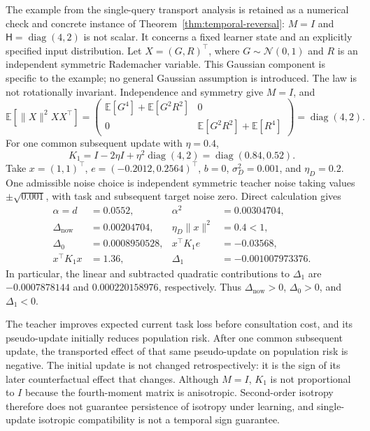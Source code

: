 The example from the single-query transport analysis is retained as a
numerical check and concrete instance of Theorem~\ref{thm:temporal-reversal}:
$M=I$ and $\mathsf H=\operatorname{diag}(4,2)$ is not scalar. It concerns
a fixed learner state and an explicitly specified input distribution.
Let $X=(G,R)^\top$, where $G\sim\mathcal N(0,1)$
and $R$ is an independent symmetric Rademacher variable. This Gaussian
component is specific to the example; no general Gaussian assumption is
introduced. The law is not rotationally invariant. Independence and
symmetry give $M=I$, and
\begin{equation}
    \mathbb E[\|X\|^2XX^\top]
    =\begin{pmatrix}
       \mathbb E[G^4]+\mathbb E[G^2R^2]&0\\
       0&\mathbb E[G^2R^2]+\mathbb E[R^4]
      \end{pmatrix}
    =\operatorname{diag}(4,2).
\end{equation}
For one common subsequent update with $\eta=0.4$,
\begin{equation}
    K_1=I-2\eta I+\eta^2\operatorname{diag}(4,2)
       =\operatorname{diag}(0.84,0.52).
\end{equation}
Take $x=(1,1)^\top$, $e=(-0.2012,0.2564)^\top$, $b=0$,
$\sigma_D^2=0.001$, and $\eta_D=0.2$. One admissible noise choice is
independent symmetric teacher noise taking values $\pm\sqrt{0.001}$,
with task and subsequent target noise zero. Direct calculation gives
\begin{align}
    \alpha=d&=0.0552, & \alpha^2&=0.00304704,\\
    \Delta_{\mathrm{now}}&=0.00204704, &
    \eta_D\|x\|^2&=0.4<1,\\
    \Delta_0&=0.0008950528, & x^\top K_1e&=-0.03568,\\
    x^\top K_1x&=1.36, & \Delta_1&=-0.001007973376.
\end{align}
In particular, the linear and subtracted quadratic contributions to
$\Delta_1$ are $-0.0007878144$ and $0.000220158976$, respectively.
Thus $\Delta_{\mathrm{now}}>0$, $\Delta_0>0$, and $\Delta_1<0$.

The teacher improves expected current task loss before consultation cost,
and its pseudo-update initially reduces population risk. After one common
subsequent update, the transported effect of that same pseudo-update on
population risk is negative. The initial update is not changed
retrospectively: it is the sign of its later counterfactual effect that
changes. Although $M=I$, $K_1$ is not proportional to $I$ because the
fourth-moment matrix is anisotropic. Second-order isotropy therefore does
not guarantee persistence of isotropy under learning, and single-update
isotropic compatibility is not a temporal sign guarantee.

